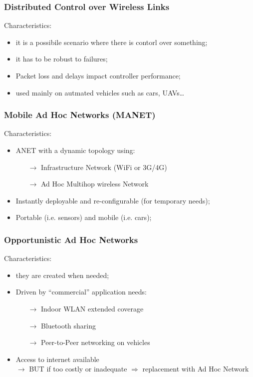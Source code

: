 \subsubsection{Distributed Control over Wireless Links}

Characteristics:
\begin{itemize}
    \item it is a possibile scenario where there is contorl over something;
    \item it has to be robust to failures;
    \item Packet loss and delays impact controller performance;
    \item used mainly on autmated vehicles such as cars, UAVs\dots
\end{itemize}
\newpage
\subsubsection{Mobile Ad Hoc Networks (MANET)}

Characteristics:
\begin{itemize}
    \item ANET with a dynamic topology using:
    \begin{itemize}
        \item[$\rightarrow$] Infrastructure Network (WiFi or 3G/4G)
        \item[$\rightarrow$] Ad Hoc Multihop wireless Network
    \end{itemize}
    \item Instantly deployable and re-configurable (for temporary needs);
    \item Portable (i.e. sensors) and mobile (i.e. cars);
\end{itemize}

\subsubsection{Opportunistic Ad Hoc Networks}

Characteristics:
\begin{itemize}
    \item they are created when needed;
    \item Driven by “commercial” application needs:
    \begin{itemize}
        \item[$\rightarrow$] Indoor WLAN extended coverage
        \item[$\rightarrow$] Bluetooth sharing
        \item[$\rightarrow$] Peer-to-Peer networking on vehicles
    \end{itemize}
    \item Access to internet available\\ $\rightarrow$ BUT if too costly or inadequate
    $\Rightarrow$ replacement with Ad Hoc Network
\end{itemize}


